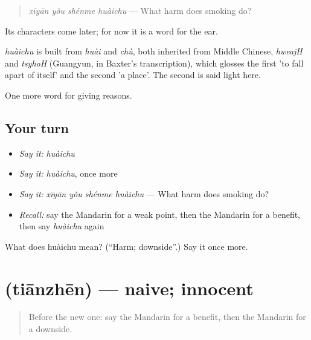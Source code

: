 \begin{quote}
\emph{xīyān yǒu shénme huàichu} — What harm does smoking do?
\end{quote}

Its characters come later; for now it is a word for the ear.

\begin{cousinweb}
\emph{huàichu} is built from \emph{huài} and \emph{chù}, both inherited from Middle Chinese, \emph{hweajH} and \emph{tsyhoH} (Guangyun, in Baxter's transcription), which glosses the first 'to fall apart of itself' and the second 'a place'. The second is said light here.
\end{cousinweb}

\begin{grammarlens}[title={What you've built}]
One more word for giving reasons.
\end{grammarlens}

\subsection*{Your turn}
\begin{itemize}
\raggedright
  \item \emph{Say it:} \emph{huàichu}
  \item \emph{Say it:} \emph{huàichu}, once more
  \item \emph{Say it:} \emph{xīyān yǒu shénme huàichu} — What harm does smoking do?
  \item \emph{Recall:} say the Mandarin for a weak point, then the Mandarin for a benefit, then say \emph{huàichu} again
\end{itemize}

\begin{tcolorbox}[breakable,colback=teal!4,colframe=teal!35!black,title={Before you move on}]
What does huàichu mean? (\textquotedblleft{}Harm; downside\textquotedblright{}.) Say it once more.
\end{tcolorbox}
\section[\texorpdfstring{\zh{天真} (tiānzhēn)}{天真 (tiānzhēn)}]{ (tiānzhēn) — naive; innocent}

\label{lesson:ZH-C373-tianzhen}



\begin{quote}
Before the new one: say the Mandarin for a benefit, then the Mandarin for a downside.
\end{quote}


